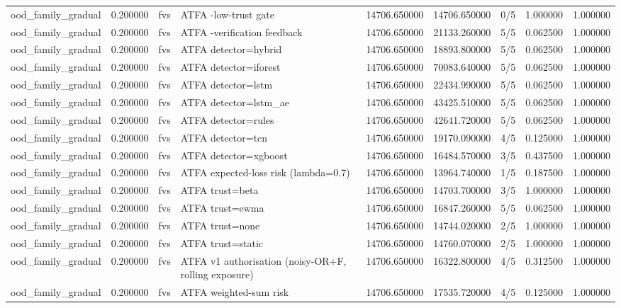 \begin{tabular}{lrllrrlrr}
ood\_family\_gradual & 0.200000 & fvs & ATFA -low-trust gate & 14706.650000 & 14706.650000 & 0/5 & 1.000000 & 1.000000 \\
ood\_family\_gradual & 0.200000 & fvs & ATFA -verification feedback & 14706.650000 & 21133.260000 & 5/5 & 0.062500 & 1.000000 \\
ood\_family\_gradual & 0.200000 & fvs & ATFA detector=hybrid & 14706.650000 & 18893.800000 & 5/5 & 0.062500 & 1.000000 \\
ood\_family\_gradual & 0.200000 & fvs & ATFA detector=iforest & 14706.650000 & 70083.640000 & 5/5 & 0.062500 & 1.000000 \\
ood\_family\_gradual & 0.200000 & fvs & ATFA detector=lstm & 14706.650000 & 22434.990000 & 5/5 & 0.062500 & 1.000000 \\
ood\_family\_gradual & 0.200000 & fvs & ATFA detector=lstm\_ae & 14706.650000 & 43425.510000 & 5/5 & 0.062500 & 1.000000 \\
ood\_family\_gradual & 0.200000 & fvs & ATFA detector=rules & 14706.650000 & 42641.720000 & 5/5 & 0.062500 & 1.000000 \\
ood\_family\_gradual & 0.200000 & fvs & ATFA detector=tcn & 14706.650000 & 19170.090000 & 4/5 & 0.125000 & 1.000000 \\
ood\_family\_gradual & 0.200000 & fvs & ATFA detector=xgboost & 14706.650000 & 16484.570000 & 3/5 & 0.437500 & 1.000000 \\
ood\_family\_gradual & 0.200000 & fvs & ATFA expected-loss risk (lambda=0.7) & 14706.650000 & 13964.740000 & 1/5 & 0.187500 & 1.000000 \\
ood\_family\_gradual & 0.200000 & fvs & ATFA trust=beta & 14706.650000 & 14703.700000 & 3/5 & 1.000000 & 1.000000 \\
ood\_family\_gradual & 0.200000 & fvs & ATFA trust=ewma & 14706.650000 & 16847.260000 & 5/5 & 0.062500 & 1.000000 \\
ood\_family\_gradual & 0.200000 & fvs & ATFA trust=none & 14706.650000 & 14744.020000 & 2/5 & 1.000000 & 1.000000 \\
ood\_family\_gradual & 0.200000 & fvs & ATFA trust=static & 14706.650000 & 14760.070000 & 2/5 & 1.000000 & 1.000000 \\
ood\_family\_gradual & 0.200000 & fvs & ATFA v1 authorisation (noisy-OR+F, rolling exposure) & 14706.650000 & 16322.800000 & 4/5 & 0.312500 & 1.000000 \\
ood\_family\_gradual & 0.200000 & fvs & ATFA weighted-sum risk & 14706.650000 & 17535.720000 & 4/5 & 0.125000 & 1.000000 \\

\end{tabular}
